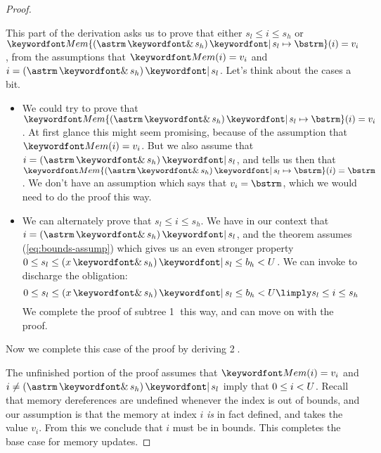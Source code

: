 \documentclass[11pt,twoside]{scrartcl}
\begin{document}
\begin{proof}
\begin{sequentdeduction}
 {
}
\end{sequentdeduction}
This part of the derivation asks us to prove that either $s_l \le i \le s_h$ or $\memupd{\pderefop}{(\astrm \bitand s_h) \bitor s_l}{\bstrm}(i)=v_i$, from the assumptions that $\pderef{i}=v_i$ and $i = (\astrm \bitand s_h) \bitor s_l$. Let's think about the cases a bit.
\begin{itemize}
\item We could try to prove that $\memupd{\pderefop}{(\astrm \bitand s_h) \bitor s_l}{\bstrm}(i)=v_i$. At first glance this might seem promising, because of the assumption that $\pderef{i}=v_i$. But we also assume that $i = (\astrm \bitand s_h) \bitor s_l$, and  tells us then that $\memupd{\pderefop}{(\astrm \bitand s_h) \bitor s_l}{\bstrm}(i) = \bstrm$. We don't have an assumption which says that $v_i = \bstrm$, which we would need to do the proof this way.
\item We can alternately prove that $s_l \le i \le s_h$. We have in our context that $i = (\astrm \bitand s_h) \bitor s_l$, and the theorem assumes (\ref{eq:bounds-assump}) which gives us an even stronger property $0 \le s_l \le  (x \bitand s_h) \bitor s_l \le b_h < \maxmem$. We can invoke  to discharge the obligation:
\[
0 \le s_l \le  (x \bitand s_h) \bitor s_l \le b_h < \maxmem \limply s_l \le i \le s_h
\]
We complete the proof of subtree \textcircled{1} this way, and can move on with the proof.
\end{itemize}

Now we complete this case of the proof by deriving \textcircled{2}.
\begin{sequentdeduction}
 {
}
\end{sequentdeduction}
The unfinished portion of the proof assumes that $\pderef{i}=v_i$ and $i \ne (\astrm \bitand s_h) \bitor s_l$ imply that $0 \le i < U$. Recall that memory dereferences are undefined whenever the index is out of bounds, and our assumption is that the memory at index $i$ \emph{is} in fact defined, and takes the value $v_i$. From this we conclude that $i$ must be in bounds. This completes the base case for memory updates.


\end{proof}
\end{document}
